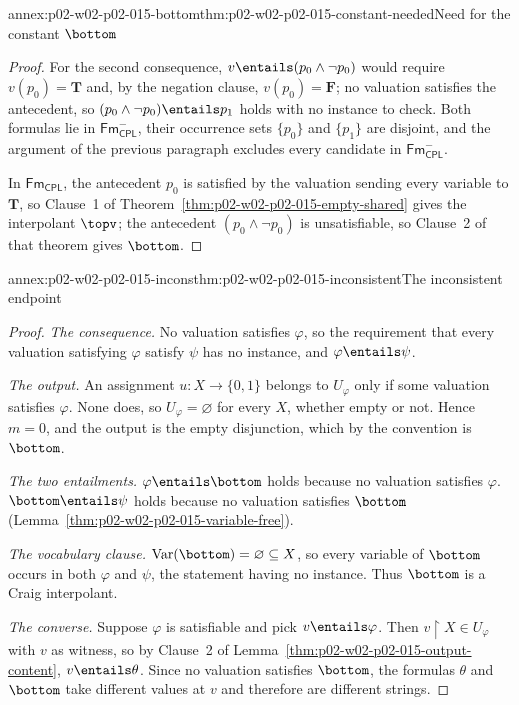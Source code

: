 \begin{annexitem}{annex:p02-w02-p02-015-bottom}{thm:p02-w02-p02-015-constant-needed}{Need for the constant \(\bottom\)}
\begin{proof}
For the second consequence, \(v\entails(p_0\land\neg p_0)\) would require
\(v(p_0)=\mathbf{T}\) and, by the negation clause, \(v(p_0)=\mathbf{F}\); no valuation
satisfies the antecedent, so \((p_0\land\neg p_0)\entails p_1\) holds with no
instance to check.  Both formulas lie in \(\mathsf{Fm}_{\mathsf{CPL}}^{-}\), their occurrence
sets \(\{p_0\}\) and \(\{p_1\}\) are disjoint, and the argument of the
previous paragraph excludes every candidate in \(\mathsf{Fm}_{\mathsf{CPL}}^{-}\).

In \(\mathsf{Fm}_{\mathsf{CPL}}\), the antecedent \(p_0\) is satisfied by the valuation
sending every variable to \(\mathbf{T}\), so Clause~1 of
Theorem~\ref{thm:p02-w02-p02-015-empty-shared} gives the interpolant
\(\topv\); the antecedent \((p_0\land\neg p_0)\) is unsatisfiable, so Clause~2
of that theorem gives \(\bottom\).
\end{proof}
\end{annexitem}

\begin{annexitem}{annex:p02-w02-p02-015-incons}{thm:p02-w02-p02-015-inconsistent}{The inconsistent endpoint}
\begin{proof}
\emph{The consequence.}  No valuation satisfies \(\varphi\), so the
requirement that every valuation satisfying \(\varphi\) satisfy \(\psi\) has
no instance, and \(\varphi\entails\psi\).

\emph{The output.}  An assignment \(u:X\to\{0,1\}\) belongs to
\(U_\varphi\) only if some valuation satisfies \(\varphi\).  None does, so
\(U_\varphi=\varnothing\) for every \(X\), whether empty or not.  Hence
\(m=0\), and the output is the empty disjunction, which by the convention is
\(\bottom\).

\emph{The two entailments.}  \(\varphi\entails\bottom\) holds because no
valuation satisfies \(\varphi\).  \(\bottom\entails\psi\) holds because no
valuation satisfies \(\bottom\)
(Lemma~\ref{thm:p02-w02-p02-015-variable-free}).

\emph{The vocabulary clause.}  \(\operatorname{Var}(\bottom)=\varnothing
\subseteq X\), so every variable of \(\bottom\) occurs in both \(\varphi\) and
\(\psi\), the statement having no instance.  Thus \(\bottom\) is a Craig
interpolant.

\emph{The converse.}  Suppose \(\varphi\) is satisfiable and pick
\(v\entails\varphi\).  Then \(v\mathbin{\upharpoonright}X\in U_\varphi\) with
\(v\) as witness, so by Clause~2 of
Lemma~\ref{thm:p02-w02-p02-015-output-content}, \(v\entails\theta\).  Since
no valuation satisfies \(\bottom\), the formulas \(\theta\) and \(\bottom\)
take different values at \(v\) and therefore are different strings.
\end{proof}
\end{annexitem}

